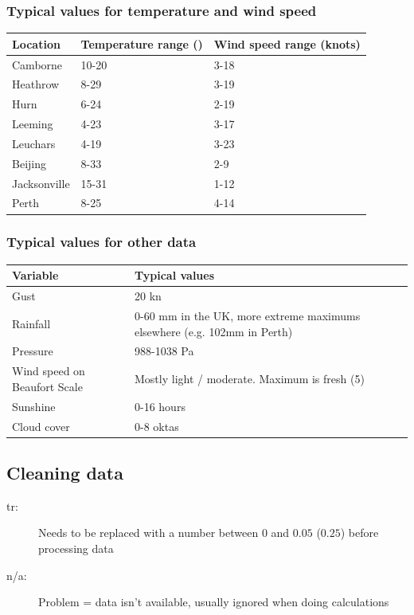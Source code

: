\documentclass[A4paper, 11pt]{article}
\begin{document}
	\subsubsection{Typical values for temperature and wind speed}
	\begin{tabular}{|l|l|l|}
		\hline
		\textbf{Location} & \textbf{Temperature range (\textcelsius)}& \textbf{Wind speed range (knots)} \\
		\hline
		Camborne & 10-20 & 3-18 \\
		\hline
		Heathrow & 8-29 & 3-19 \\
		\hline
		Hurn & 6-24 & 2-19 \\
		\hline
		Leeming & 4-23 & 3-17 \\
		\hline
		Leuchars & 4-19 & 3-23 \\
		\hline
		Beijing & 8-33 & 2-9 \\
		\hline
		Jacksonville & 15-31 & 1-12 \\
		\hline
		Perth & 8-25 & 4-14 \\
		\hline
	\end{tabular}
	
	\subsubsection{Typical values for other data}
	\begin{tabular}{|p{4.8cm} | p{12.2cm}|}
		\hline
		\textbf{Variable} & \textbf{Typical values} \\
		\hline
		Gust & 20 kn \\
		\hline
		Rainfall & 0-60 mm in the UK, more extreme maximums elsewhere (e.g. 102mm in Perth) \\
		\hline
		Pressure & 988-1038 Pa \\
		\hline
		Wind speed on Beaufort Scale & Mostly light / moderate. Maximum is fresh (5) \\
		\hline
		Sunshine & 0-16 hours \\
		\hline
		Cloud cover & 0-8 oktas \\
		\hline
	\end{tabular}
	
	\subsection{Cleaning data}
	\begin{description}
		\item[tr:] Needs to be replaced with a number between $0$ and $0.05$ ($0.25$) before processing data
		\item[n/a:] Problem = data isn't available, usually ignored when doing calculations
	\end{description}
	
\end{document}
